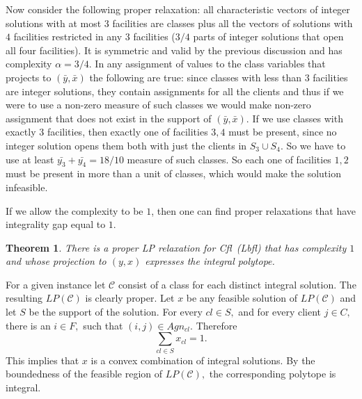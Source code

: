 \documentclass[11pt]{article}\usepackage{amsmath}
\newtheorem{theorem}{Theorem}[section]
\newcommand{\lbfl}{{\sc Lbfl}}
\newcommand{\cfl}{{\sc Cfl}}
\begin{document}
Now consider the following proper relaxation: all characteristic vectors 
of integer solutions with at most
$3$ facilities are classes plus all the 
vectors of solutions with $4$ facilities restricted in any $3$ facilities ($3/4$ parts of integer solutions that open all four facilities).
It is symmetric and valid by the previous discussion and has complexity $\alpha=3/4$. 
In any assignment of values to the class variables  that projects to $(\bar{y},\bar{x})$ the following are true:
since classes with less than $3$ facilities are integer solutions, they contain
assignments for all the clients and thus if we were 
to use a non-zero measure of such classes we would make non-zero assignment 
that does not exist in the support of $(\bar{y},\bar{x})$.
 If we use
classes with exactly $3$ facilities, then exactly one of facilities $3,4$ must be present, 
since no integer solution opens them both with just the clients in $S_3 \cup S_4$. 
So we have to use at least $\bar{y_3}+\bar{y_4}=18/10$ measure of such classes. 
So each one of facilities $1,2$
must be present in more than a unit of classes, which would make the solution infeasible.


\iffalse   ---- contained in the main body of the paper 
\begin{theorem}  \label{thm:gap1}
There is a proper LP relaxation for \cfl\ (\lbfl\/)  whose projection to $(y,x)$ expresses the
integral polytope. 
\end{theorem}
\fi 
\medskip


If we allow the complexity to be $1$, then one can find
proper relaxations that have integrality gap equal to $1.$ 



\begin{theorem}  \label{thm:gap1}
There is a proper LP relaxation for \cfl\ (\lbfl\/)  that has complexity $1$ 
and whose projection to $(y,x)$ expresses the
integral polytope. 
\end{theorem}

{}
For a given instance let $\mathcal{C}$ consist of a class for each
distinct integral solution. The resulting $LP(\mathcal{C})$ is clearly
proper. Let $x$ be any feasible solution of $LP(\mathcal{C})$ and let
$S$ be the support of  the solution. For every $cl \in S,$ and 
for every client $j \in C,$ there is an $i \in F,$ such that $(i,j)
\in Agn_{cl}.$ Therefore 
$$ \sum_{cl \in S} x_{cl} = 1.$$
This implies that $x$ is a convex combination of integral
solutions. By the boundedness of the feasible region of
$LP(\mathcal{C}),$ the  corresponding polytope is integral.  
\mbox{} \hfill \mathqed  
\end{document}
